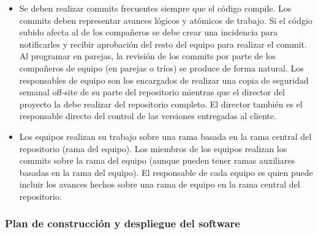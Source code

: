 \begin{itemize}
\item{Se deben realizar commits frecuentes siempre que el código compile. Los commits deben representar avances lógicos y atómicos de trabajo.  Si el códgio subido afecta al de los compañeros se debe crear una incidencia para notificarles  y recibir aprobación del resto del equipo para realizar el commit. Al programar en parejas, la revisión de los commits por parte de los compañeros de equipo (en parejas o tríos) se produce de forma natural. Los responsables de equipo son los encargados de realizar una copia de seguridad semanal off-site de su parte del repositorio mientras que el director del proyecto la debe realizar del repositorio completo. El director también es el responsable directo del control de las versiones entregadas al cliente. }
		\item Los equipos realizan su trabajo sobre una rama basada en la rama central del repositorio (rama del equipo). Los miembros de los equipos realizan los commits sobre la rama del equipo (aunque pueden tener ramas auxiliares basadas en la rama del equipo). El responsable de cada equipo es quien puede incluir los avances hechos sobre una rama de equipo en la rama central del repositorio.
\end{itemize}

\subsubsection{Plan de construcción y despliegue del software}

